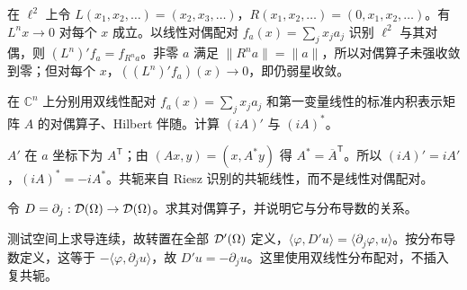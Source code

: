 \begin{example}[转置不保持算子强收敛]
在 $\ell^2$ 上令 $L(x_1,x_2,\ldots)=(x_2,x_3,\ldots)$，$R(x_1,x_2,\ldots)=(0,x_1,x_2,\ldots)$。有 $L^nx\to0$ 对每个 $x$ 成立。以线性对偶配对 $f_a(x)=\sum_jx_ja_j$ 识别 $\ell^2$ 与其对偶，则 $(L^n)'f_a=f_{R^na}$。非零 $a$ 满足 $\|R^na\|=\|a\|$，所以对偶算子未强收敛到零；但对每个 $x$，$((L^n)'f_a)(x)\to0$，即仍弱星收敛。
\end{example}

\begin{exercise}[矩阵与标量]\label{ex:y7-matrix}
在 $\mathbb C^n$ 上分别用双线性配对 $f_a(x)=\sum_jx_ja_j$ 和第一变量线性的标准内积表示矩阵 $A$ 的对偶算子、Hilbert 伴随。计算 $(iA)'$ 与 $(iA)^*$。
\end{exercise}
\begin{solution}
$A'$ 在 $a$ 坐标下为 $A^{\mathsf T}$；由 $(Ax,y)=(x,A^*y)$ 得 $A^*=\overline A^{\mathsf T}$。所以 $(iA)'=iA'$，$(iA)^*=-iA^*$。共轭来自 Riesz 识别的共轭线性，而不是线性对偶配对。
\end{solution}

\begin{exercise}[分布求导的转置]\label{ex:y7-distribution}
令 $D=\partial_j:\mathcal{D}(\Omega)\to\mathcal{D}(\Omega)$。求其对偶算子，并说明它与分布导数的关系。
\end{exercise}
\begin{solution}
测试空间上求导连续，故转置在全部 $\mathcal{D}'(\Omega)$ 定义，$\langle\varphi,D'u\rangle=\langle\partial_j\varphi,u\rangle$。按分布导数定义，这等于 $-\langle\varphi,\partial_ju\rangle$，故 $D'u=-\partial_ju$。这里使用双线性分布配对，不插入复共轭。
\end{solution}
